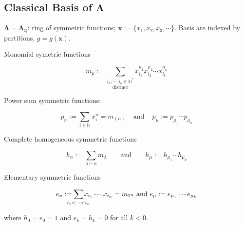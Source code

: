 \documentclass[12pt]{amsart}
\begin{document}
\vspace{-10pt}\begin{mdframed}[linecolor=cyan!20, linewidth=3pt]
\section{Classical Basis of $\mathbf{\Lambda}$}
$\mathbf{\Lambda}=\mathbf{\Lambda}_{\mathbb{Q}}$: ring of symmetric functions; $\bm{x}:=\{x_1,x_2,x_3,\cdots \} $. Basis are indexed by partitions, $g=g(\bm{x})$.

	  \begin{minipage}[t]{9.35cm}
		 \begin{bf}Monomial symetric functions\end{bf}
		  \begin{equation}m_\mu:=\underset{\text{ distinct }}{\underset{ i_1, \cdots, i_{k}\in\mathbb{N}^*}{\sum} }x_{i_1}^{\mu_1}x_{i_2}^{\mu_2}\cdots x_{i_{k}}^{\mu_{k}}\end{equation}
		\end{minipage}
	   \begin{minipage}[t]{10.25cm}
		  \begin{bf}Power sum symmetric functions:\end{bf}
		 \begin{equation}p_n:=\underset{i\in\mathbb{N}}{\sum}x_i^n =m_{(n)}\hspace{10pt}\text{ and }\hspace{10pt} p_\mu:=p_{\mu_1}\cdots p_{\mu_{k}}\end{equation}
	 \end{minipage} 

  	\begin{minipage}[t]{9.35cm}
 		 \begin{bf}Complete homogeneous symmetric functions\end{bf}
		 \begin{equation} h_n:=\underset{\lambda \vdash n}{\sum} m_\lambda \hspace{20pt}\text{ and }\hspace{20pt} h_\mu:=h_{\mu_1}\cdots h_{\mu_{k}}\end{equation}
	 \end{minipage}
	  \begin{minipage}[t]{10.25cm}
		\begin{bf}Elementary symmetric functions\end{bf}
		 \begin{equation} e_n:=\hspace{-10pt}\underset{ i_1<\cdots<i_{n}}{\sum} \hspace{-9pt}x_{i_1}\cdots x_{i_{n}} =m_{1^n}\hspace{0pt}\text{ and }\hspace{0pt} e_\mu:=e_{\mu_1}\cdots e_{\mu_{k}}\end{equation}
 	\end{minipage}
 where $h_0=e_0=1$ and $e_k=h_k=0$ for all $k<0$.


\end{mdframed}
\end{document}
